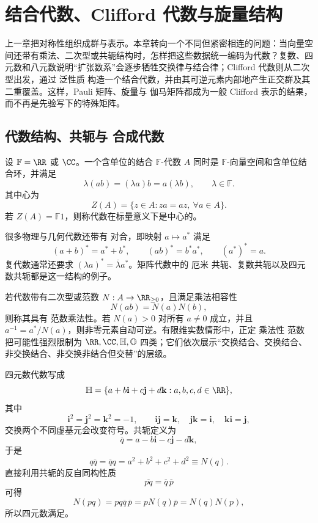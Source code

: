\chapter{结合代数、Clifford 代数与旋量结构}
\label{chap:algebra-number-systems}

上一章把对称性组织成群与表示。本章转向一个不同但紧密相连的问题：当向量空间还带有乘法、二次型或共轭结构时，怎样把这些数据统一编码为代数？复数、四元数和八元数说明“扩张数系”会逐步牺牲交换律与结合律；Clifford 代数则从二次型出发，通过 泛性质 构造一个结合代数，并由其可逆元素内部地产生正交群及其二重覆盖。这样，Pauli 矩阵、旋量与 伽马矩阵都成为一般 Clifford 表示的结果，而不再是先验写下的特殊矩阵。

\section{代数结构、共轭与 合成代数}
\label{sec:algebra-composition}
设 $\mathbb F=\RR$ 或 $\CC$。一个含单位的结合 $\mathbb F$-代数 $A$ 同时是 $\mathbb F$-向量空间和含单位结合环，并满足
\[
\lambda(ab)=(\lambda a)b=a(\lambda b),
\qquad
\lambda\in\mathbb F.
\]
其中心为
\[
Z(A)=\{z\in A:za=az,\ \forall a\in A\}.
\]
若 $Z(A)=\mathbb F1$，则称代数在标量意义下是中心的。

很多物理与几何代数还带有 对合，即映射 $a\mapsto a^*$ 满足
\[
(a+b)^*=a^*+b^*,
\qquad
(ab)^*=b^*a^*,
\qquad
(a^*)^*=a.
\]
复代数通常还要求 $(\lambda a)^*=\overline\lambda a^*$。矩阵代数中的 厄米 共轭、复数共轭以及四元数共轭都是这一结构的例子。

若代数带有二次型或范数 $N:A\to\RR_{\ge0}$，且满足乘法相容性
\begin{equation}
N(ab)=N(a)N(b),
\label{eq:composition-norm}
\end{equation}
则称其具有 范数乘法性。若 $N(a)>0$ 对所有 $a\neq0$ 成立，并且 $a^{-1}=a^*/N(a)$，则非零元素自动可逆。有限维实数情形中，正定 乘法性 范数 把可能性强烈限制为 $\RR,\CC,\mathbb H,\mathbb O$ 四类；它们依次展示“交换结合、交换结合、非交换结合、非交换非结合但交替”的层级。
\label{sec:quaternions}

四元数代数写成
\[
\mathbb H
=\{a+b\mathbf i+c\mathbf j+d\mathbf k:
a,b,c,d\in\RR\},
\]
其中
\[
\mathbf i^2=\mathbf j^2=\mathbf k^2=-1,
\qquad
\mathbf i\mathbf j=\mathbf k,
\quad
\mathbf j\mathbf k=\mathbf i,
\quad
\mathbf k\mathbf i=\mathbf j,
\]
交换两个不同虚基元会改变符号。共轭定义为
\[
\overline q=a-b\mathbf i-c\mathbf j-d\mathbf k,
\]
于是
\[
q\overline q=\overline q q
=a^2+b^2+c^2+d^2
\equiv N(q).
\]
直接利用共轭的反自同构性质
\[
\overline{pq}=\overline q\,\overline p
\]
可得
\[
N(pq)
=pq\overline q\,\overline p
=pN(q)\overline p
=N(q)N(p),
\]
所以四元数满足。

